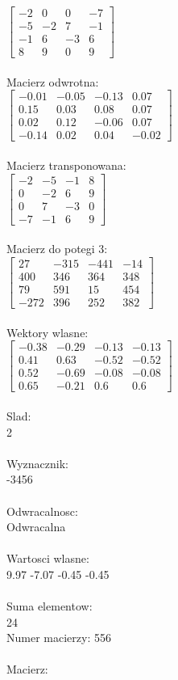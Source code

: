 \documentclass[a4paper,12pt]{article}
\begin{document}
$\begin{bmatrix} -2&0&0&-7\\-5&-2&7&-1\\-1&6&-3&6\\8&9&0&9 \end{bmatrix}$
\\
\\
Macierz odwrotna:\\

$\begin{bmatrix} -0.01&-0.05&-0.13&0.07\\0.15&0.03&0.08&0.07\\0.02&0.12&-0.06&0.07\\-0.14&0.02&0.04&-0.02 \end{bmatrix}$
\\
\\
Macierz transponowana:\\

$\begin{bmatrix} -2&-5&-1&8\\0&-2&6&9\\0&7&-3&0\\-7&-1&6&9 \end{bmatrix}$
\\
\\
Macierz do potegi 3:\\

$\begin{bmatrix} 27&-315&-441&-14\\400&346&364&348\\79&591&15&454\\-272&396&252&382 \end{bmatrix}$
\\
\\
Wektory wlasne:\\

$\begin{bmatrix} -0.38&-0.29&-0.13&-0.13\\0.41&0.63&-0.52&-0.52\\0.52&-0.69&-0.08&-0.08\\0.65&-0.21&0.6&0.6 \end{bmatrix}$
\\
\\
Slad:\\
2
\\
\\
Wyznacznik:\\
-3456
\\
\\
Odwracalnosc:\\
Odwracalna
\\
\\
Wartosci wlasne:\\
9.97 -7.07 -0.45 -0.45
\\
\\
Suma elementow:\\
24
\\
\newpage
Numer macierzy:
556
\\
\\
Macierz:\\
\end{document}
